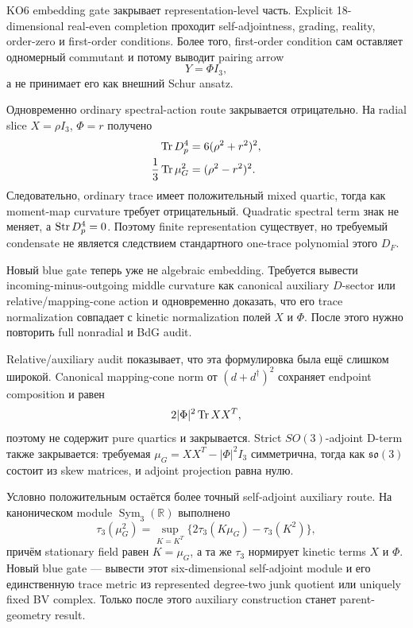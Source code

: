 KO6 embedding gate закрывает representation-level часть. Explicit
18-dimensional real-even completion проходит self-adjointness, grading,
reality, order-zero и first-order conditions. Более того, first-order
condition сам оставляет одномерный commutant и потому выводит
pairing arrow
\begin{equation}
 Y=\Phi I_3,
\end{equation}
а не принимает его как внешний Schur ansatz.

Одновременно ordinary spectral-action route закрывается отрицательно. На
radial slice \(X=\rho I_3\), \(\Phi=r\) получено
\begin{align}
 \operatorname{Tr} D_p^4&=6(\rho^2+r^2)^2,\\
 \frac13\operatorname{Tr}\mu_G^2&=(\rho^2-r^2)^2.
\end{align}
Следовательно, ordinary trace имеет положительный mixed quartic, тогда как
moment-map curvature требует отрицательный. Quadratic spectral term знак
не меняет, а \(\operatorname{Str} D_p^4=0\). Поэтому finite representation существует,
но требуемый condensate не является следствием стандартного
one-trace polynomial этого \(D_F\).

Новый blue gate теперь уже не algebraic embedding. Требуется вывести
incoming-minus-outgoing middle curvature как canonical auxiliary
\(D\)-sector или relative/mapping-cone action и одновременно доказать, что
его trace normalization совпадает с kinetic normalization полей \(X\) и
\(\Phi\). После этого нужно повторить full nonradial и BdG audit.

Relative/auxiliary audit показывает, что эта формулировка была ещё слишком
широкой. Canonical mapping-cone norm от \((d+d^\dagger)^2\) сохраняет
endpoint composition и равен
\begin{equation}
 2|\Phi|^2\operatorname{Tr} XX^T,
\end{equation}
поэтому не содержит pure quartics и закрывается. Strict
\(SO(3)\)-adjoint D-term также закрывается: требуемая
\(\mu_G=XX^T-|\Phi|^2I_3\) симметрична, тогда как
\(\mathfrak{so}(3)\) состоит из skew matrices, и adjoint projection равна
нулю.

Условно положительным остаётся более точный self-adjoint auxiliary route.
На каноническом module \(\operatorname{Sym}_3(\mathbb R)\) выполнено
\begin{equation}
 \tau_3(\mu_G^2)
 =\sup_{K=K^T}\{2\tau_3(K\mu_G)-\tau_3(K^2)\},
\end{equation}
причём stationary field равен \(K=\mu_G\), а та же \(\tau_3\) нормирует
kinetic terms \(X\) и \(\Phi\). Новый blue gate --- вывести этот
six-dimensional self-adjoint module и его единственную trace metric из
represented degree-two junk quotient или uniquely fixed BV complex. Только
после этого auxiliary construction станет parent-geometry result.

